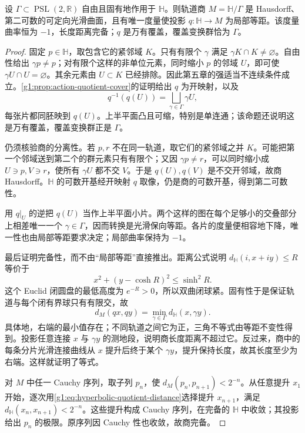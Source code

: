 \begin{theorem}\label{g1:thm:hyperbolic-quotient}
	设 \(\Gamma\subset\operatorname{PSL}(2,\mathbb R)\) 自由且固有地作用于 \(\mathbb H\)。则轨道商 \(M=\mathbb H/\Gamma\) 是 Hausdorff、第二可数的可定向光滑曲面，且有唯一度量使投影 \(q:\mathbb H\to M\) 为局部等距。该度量曲率恒为 \(-1\)，长度距离完备；\(q\) 是万有覆盖，覆盖变换群恰为 \(\Gamma\)。
\end{theorem}
\begin{proof}
	固定 \(p\in\mathbb H\)，取包含它的紧邻域 \(K\)。只有有限个 \(\gamma\) 满足 \(\gamma K\cap K\ne\varnothing\)。自由性给出 \(\gamma p\ne p\)；对有限个这样的非单位元素，同时缩小 \(p\) 的邻域 \(U\)，即可使 \(\gamma U\cap U=\varnothing\)。其余元素由 \(U\subset K\) 已经排除。因此第五章的强适当不连续条件成立。\cref{g1:prop:action-quotient-cover}的证明给出 \(q\) 为开映射，以及
	\[
		q^{-1}(q(U))=\bigsqcup_{\gamma\in\Gamma}\gamma U,
	\]
	每张片都同胚映到 \(q(U)\)。上半平面凸且可缩，特别是单连通；该命题还说明这是万有覆盖，覆盖变换群正是 \(\Gamma\)。

	仍须核验商的分离性。若 \(p,r\) 不在同一轨道，取它们的紧邻域之并 \(K\)。可能把第一个邻域送到第二个的群元素只有有限个；又因 \(\gamma p\ne r\)，可以同时缩小成 \(U\ni p,V\ni r\)，使所有 \(\gamma U\) 都不交 \(V\)。于是 \(q(U),q(V)\) 是不交开邻域，故商 Hausdorff。\(\mathbb H\) 的可数开基经开映射 \(q\) 取像，仍是商的可数开基，得到第二可数性。

	用 \(q|_U\) 的逆把 \(q(U)\) 当作上半平面小片。两个这样的图在每个足够小的交叠部分上相差唯一一个 \(\gamma\in\Gamma\)，因而转换是光滑保向等距。各片的度量便相容地下降，唯一性也由局部等距要求决定；局部曲率保持为 \(-1\)。

	最后证明完备性，而不由“局部等距”直接推出。距离公式说明 \(d_{\mathbb H}(i,x+iy)\le R\) 等价于
	\[
		x^2+(y-\cosh R)^2\le\sinh^2R.
	\]
	这个 Euclid 闭圆盘的最低高度为 \(e^{-R}>0\)，所以双曲闭球紧。固有性于是保证轨道与每个闭有界球只有有限交，故
	\begin{equation}\label{g1:eq:hyperbolic-quotient-distance}
		d_M(qx,qy)=\min_{\gamma\in\Gamma}d_{\mathbb H}(x,\gamma y).
	\end{equation}
	具体地，右端的最小值存在；不同轨道之间它为正，三角不等式由等距不变性得到。投影任意连接 \(x\) 与 \(\gamma y\) 的测地段，说明商长度距离不超过它。反过来，商中的每条分片光滑连接曲线从 \(x\) 提升后终于某个 \(\gamma y\)，提升保持长度，故其长度至少为右端。这样就证明了等式。

	对 \(M\) 中任一 Cauchy 序列，取子列 \(p_n\)，使 \(d_M(p_n,p_{n+1})<2^{-n}\)。从任意提升 \(x_1\) 开始，逐次用\eqref{g1:eq:hyperbolic-quotient-distance}选择提升 \(x_{n+1}\)，满足 \(d_{\mathbb H}(x_n,x_{n+1})<2^{-n}\)。这些提升构成 Cauchy 序列，在完备的 \(\mathbb H\) 中收敛；其投影给出 \(p_n\) 的极限。原序列因 Cauchy 性也收敛，故商完备。
\end{proof}

